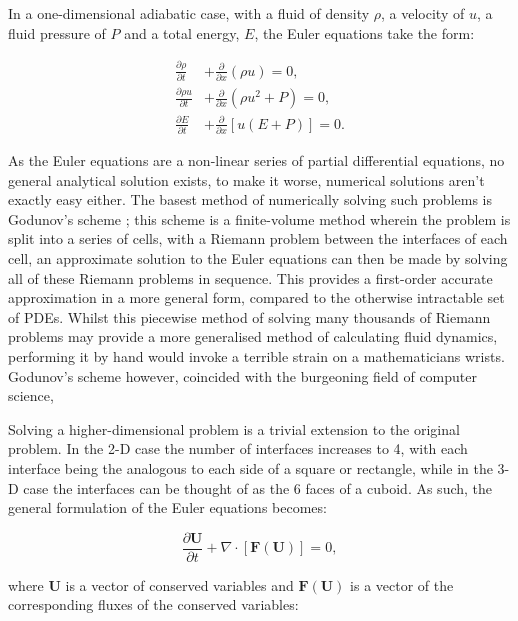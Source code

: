 In a one-dimensional adiabatic case, with a fluid of density $\rho$, a velocity of $u$, a fluid pressure of $P$ and a total energy, $E$, the Euler equations take the form:

\begin{subequations}
  \begin{align}
    \frac{\partial \rho}{\partial t} & + \frac{\partial}{\partial x} (\rho u) = 0 ,\\
    \frac{\partial \rho u}{\partial t} & + \frac{\partial}{\partial x} (\rho u^2 + P) = 0 ,\\
    \frac{\partial E}{\partial t} & + \frac{\partial}{\partial x} \left[ u(E+P) \right] = 0 .
  \end{align}
\end{subequations}

\noindent
As the Euler equations are a non-linear series of partial differential equations, no general analytical solution exists, to make it worse, numerical solutions aren't exactly easy either.
The basest method of numerically solving such problems is Godunov's scheme \parencite{godunov_difference_1959}; this scheme is a finite-volume method wherein the problem is split into a series of cells, with a Riemann problem between the interfaces of each cell, an approximate solution to the Euler equations can then be made by solving all of these Riemann problems in sequence.
This provides a first-order accurate approximation in a more general form, compared to the otherwise intractable set of PDEs. 
Whilst this piecewise method of solving many thousands of Riemann problems may provide a more generalised method of calculating fluid dynamics, performing it by hand would invoke a terrible strain on a mathematicians wrists.
Godunov's scheme however, coincided with the burgeoning field of computer science, 

Solving a higher-dimensional problem is a trivial extension to the original problem.
In the 2-D case the number of interfaces increases to 4, with each interface being the analogous to each side of a square or rectangle, while in the 3-D case the interfaces can be thought of as the 6 faces of a cuboid.
As such, the general formulation of the Euler equations becomes:

\begin{equation}
  \frac{\partial \mathbf{U}}{\partial t} + \nabla \cdot \left[ \mathbf{F}(\mathbf{U}) \right] = 0 ,
\end{equation}

\noindent
where $\mathbf{U}$ is a vector of conserved variables and $\mathbf{F}(\mathbf{U})$ is a vector of the corresponding fluxes of the conserved variables:

